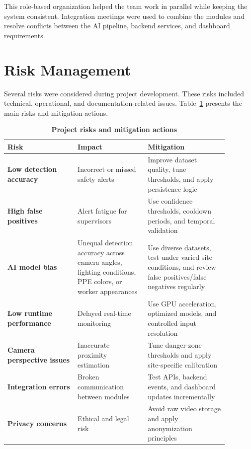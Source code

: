 This role-based organization helped the team work in parallel while keeping the system consistent. Integration meetings were used to combine the modules and resolve conflicts between the AI pipeline, backend services, and dashboard requirements.

\section{Risk Management}

Several risks were considered during project development. These risks included technical, operational, and documentation-related issues. Table~\ref{tab:chapter7-risk-management} presents the main risks and mitigation actions.

\begin{table}[H]
\centering
\renewcommand{\arraystretch}{1.55}
\begin{tabular}{|>{\centering\arraybackslash}p{0.28\linewidth}|>{\centering\arraybackslash}p{0.28\linewidth}|>{\centering\arraybackslash}p{0.32\linewidth}|}
\hline
\textbf{Risk} & \textbf{Impact} & \textbf{Mitigation} \\
\hline
\textbf{Low detection accuracy} & Incorrect or missed safety alerts & Improve dataset quality, tune thresholds, and apply persistence logic \\
\hline
\textbf{High false positives} & Alert fatigue for supervisors & Use confidence thresholds, cooldown periods, and temporal validation \\
\hline
\textbf{AI model bias} & Unequal detection accuracy across camera angles, lighting conditions, PPE colors, or worker appearances & Use diverse datasets, test under varied site conditions, and review false positives/false negatives regularly \\
\hline
\textbf{Low runtime performance} & Delayed real-time monitoring & Use GPU acceleration, optimized models, and controlled input resolution \\
\hline
\textbf{Camera perspective issues} & Inaccurate proximity estimation & Tune danger-zone thresholds and apply site-specific calibration \\
\hline
\textbf{Integration errors} & Broken communication between modules & Test APIs, backend events, and dashboard updates incrementally \\
\hline
\textbf{Privacy concerns} & Ethical and legal risk & Avoid raw video storage and apply anonymization principles \\
\hline
\end{tabular}
\caption{\textbf{Project risks and mitigation actions}}
\label{tab:chapter7-risk-management}
\end{table}

